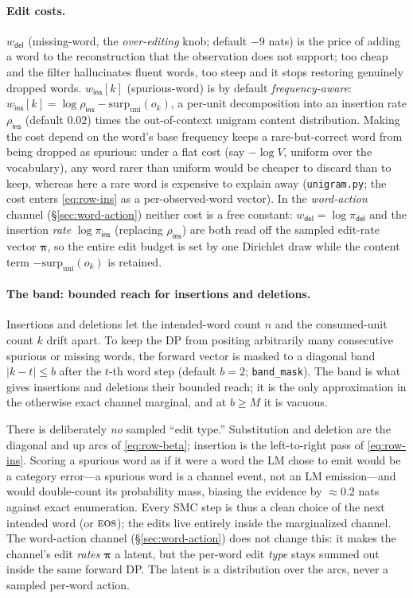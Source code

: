 \documentclass[11pt]{article}
\providecommand{\eos}{\textsc{eos}}
\providecommand{\insact}{\textsf{ins}}
\providecommand{\delact}{\textsf{del}}
\providecommand{\code}[1]{\texttt{#1}}
\providecommand{\wdel}{w_{\delact}}
\providecommand{\wins}{w_{\insact}}
\providecommand{\actdist}{\bm{\pi}}            %
\providecommand{\pins}{\pi_{\insact}}
\providecommand{\pdel}{\pi_{\delact}}
\begin{document}
\paragraph{Edit costs.} $\wdel$ (missing-word, the \emph{over-editing} knob; default $-9$ nats) is the price of adding a word to the reconstruction that the observation does not support; too cheap and the filter hallucinates fluent words, too steep and it stops restoring genuinely dropped words. $\wins[k]$ (spurious-word) is by default \emph{frequency-aware}: $\wins[k] = \log\rho_{\insact} - \mathrm{surp}_{\mathrm{uni}}(o_k)$, a per-unit decomposition into an insertion rate $\rho_{\insact}$ (default $0.02$) times the out-of-context unigram content distribution. Making the cost depend on the word's base frequency keeps a rare-but-correct word from being dropped as spurious: under a flat cost (say $-\log V$, uniform over the vocabulary), any word rarer than uniform would be cheaper to discard than to keep, whereas here a rare word is expensive to explain away (\code{unigram.py}; the cost enters \eqref{eq:row-ins} as a per-observed-word vector). In the \emph{word-action} channel (\S\ref{sec:word-action}) neither cost is a free constant: $\wdel = \log\pdel$ and the insertion \emph{rate} $\log\pins$ (replacing $\rho_{\insact}$) are both read off the sampled edit-rate vector $\actdist$, so the entire edit budget is set by one Dirichlet draw while the content term $-\mathrm{surp}_{\mathrm{uni}}(o_k)$ is retained.

\paragraph{The band: bounded reach for insertions and deletions.} Insertions and deletions let the intended-word count $n$ and the consumed-unit count $k$ drift apart. To keep the DP from positing arbitrarily many consecutive spurious or missing words, the forward vector is masked to a diagonal band $|k - t| \le b$ after the $t$-th word step (default $b = 2$; \code{band\_mask}). The band is what gives insertions and deletions their bounded reach; it is the only approximation in the otherwise exact channel marginal, and at $b \ge M$ it is vacuous.

\begin{remark}
There is deliberately \emph{no} sampled ``edit type.'' Substitution and deletion are the diagonal and up arcs of \eqref{eq:row-beta}; insertion is the left-to-right pass of \eqref{eq:row-ins}. Scoring a spurious word as if it were a word the LM chose to emit would be a category error---a spurious word is a channel event, not an LM emission---and would double-count its probability mass, biasing the evidence by $\approx 0.2$ nats against exact enumeration. Every SMC step is thus a clean choice of the next intended word (or $\eos$); the edits live entirely inside the marginalized channel. The word-action channel (\S\ref{sec:word-action}) does not change this: it makes the channel's edit \emph{rates} $\actdist$ a latent, but the per-word edit \emph{type} stays summed out inside the same forward DP. The latent is a distribution over the arcs, never a sampled per-word action.
\end{remark}
\end{document}

